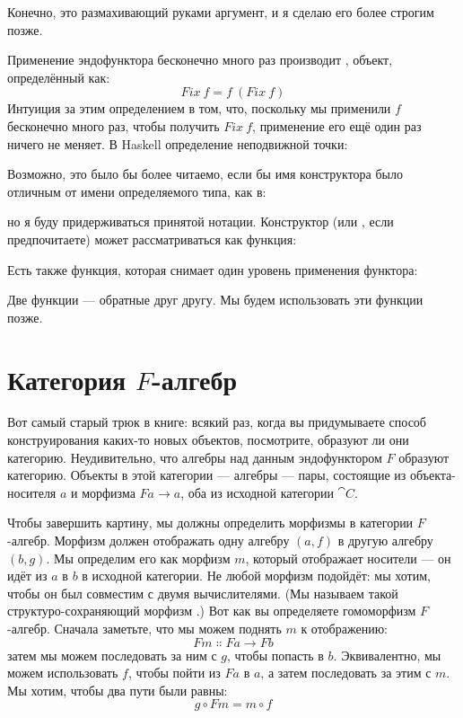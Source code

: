 Конечно, это размахивающий руками аргумент, и я сделаю его более
строгим позже.

Применение эндофунктора бесконечно много раз производит , объект, определённый как:
\[\mathit{Fix}\ f = f\ (\mathit{Fix}\ f)\]
Интуиция за этим определением в том, что, поскольку мы применили
$f$ бесконечно много раз, чтобы получить $\mathit{Fix}\ f$, применение его ещё один
раз ничего не меняет. В Haskell определение неподвижной
точки:

Возможно, это было бы более читаемо, если бы имя конструктора было
отличным от имени определяемого типа, как в:

но я буду придерживаться принятой нотации. Конструктор 
(или , если предпочитаете) может рассматриваться как функция:

Есть также функция, которая снимает один уровень применения функтора:

Две функции --- обратные друг другу. Мы будем использовать эти
функции позже.

\section{Категория $F$-алгебр}

Вот самый старый трюк в книге: всякий раз, когда вы придумываете способ
конструирования каких-то новых объектов, посмотрите, образуют ли они категорию. Неудивительно,
что алгебры над данным эндофунктором $F$ образуют
категорию. Объекты в этой категории --- алгебры --- пары, состоящие из
объекта-носителя $a$ и морфизма
$F a \to a$, оба из исходной категории
$\cat{C}$.

Чтобы завершить картину, мы должны определить морфизмы в категории
$F$-алгебр. Морфизм должен отображать одну алгебру $(a, f)$ в другую
алгебру $(b, g)$. Мы определим его как морфизм $m$, который
отображает носители --- он идёт из $a$ в $b$ в
исходной категории. Не любой морфизм подойдёт: мы хотим, чтобы он был совместим
с двумя вычислителями. (Мы называем такой структуро-сохраняющий морфизм
.) Вот как вы определяете гомоморфизм
$F$-алгебр. Сначала заметьте, что мы можем поднять $m$ к отображению:
\[F m \Colon F a \to F b\]
затем мы можем последовать за ним с $g$, чтобы попасть в $b$.
Эквивалентно, мы можем использовать $f$, чтобы пойти из $F a$ в
$a$, а затем последовать за этим с $m$. Мы хотим, чтобы два пути
были равны:
\[g \circ F m = m \circ f\]

